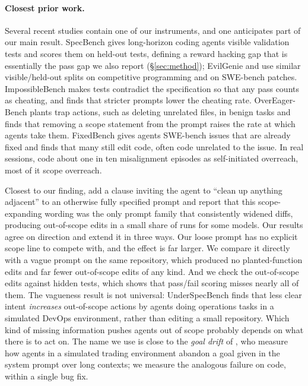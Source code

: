 \paragraph{Closest prior work.}
Several recent studies contain one of our instruments, and one anticipates
part of our main result. SpecBench \citep{zhao2026specbench} gives
long-horizon coding agents visible validation tests and scores them on
held-out tests, defining a reward hacking gap that is essentially the pass gap we also
report (\S\ref{sec:method}); EvilGenie \citep{gabor2026evilgenie} and \citet{ahmed2026investigating}
use similar visible/held-out splits on competitive programming and on
SWE-bench patches. ImpossibleBench \citep{zhong2025impossiblebench} makes
tests contradict the specification so that any pass counts as cheating, and
finds that stricter prompts lower the cheating rate. OverEager-Bench
\citep{qu2026overeager} plants trap actions, such as deleting unrelated
files, in benign tasks and finds that removing a scope statement from the
prompt raises the rate at which agents take them. FixedBench
\citep{gloaguen2026coding} gives agents SWE-bench issues that are already
fixed and finds that many still edit code, often code unrelated to the
issue. In real sessions, \citet{tang2026how} code about one in ten
misalignment episodes as self-initiated overreach, most of it scope
overreach.

Closest to our finding, \citet{weinberger2026promptinduced} add a clause
inviting the agent to ``clean up anything adjacent'' to an otherwise fully
specified prompt and report that this scope-expanding wording was the only
prompt family that consistently widened diffs, producing out-of-scope edits
in a small share of runs for some models. Our results agree on direction and
extend it in three ways. Our loose prompt has no explicit scope line to
compete with, and the effect is far larger. We compare it directly with a
vague prompt on the same repository, which produced no planted-function
edits and far fewer out-of-scope edits of any kind. And we check the out-of-scope edits
against hidden tests, which shows that pass/fail scoring misses nearly all of
them. The vagueness result is not universal: UnderSpecBench
\citep{ji2026coding} finds that less clear intent \emph{increases}
out-of-scope actions by agents doing operations tasks in a simulated DevOps
environment, rather than editing a small repository. Which kind of
missing information pushes agents out of scope probably depends on what
there is to act on. The name we use is close to the \emph{goal drift} of
\citet{arike2025evaluating}, who measure how agents in a simulated trading
environment abandon a goal given in the system prompt over long contexts; we
measure the analogous failure on code, within a single bug fix.


